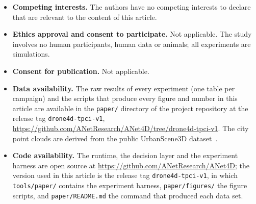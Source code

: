 \documentclass[pdflatex,sn-mathphys-num]{sn-jnl}
\begin{document}
\begin{itemize}
\item \textbf{Competing interests.} The authors have no competing interests to declare that are relevant to the
content of this article.
\item \textbf{Ethics approval and consent to participate.} Not applicable. The study involves no human participants,
human data or animals; all experiments are simulations.
\item \textbf{Consent for publication.} Not applicable.
\item \textbf{Data availability.} The raw results of every experiment (one table per campaign) and the scripts that
produce every figure and number in this article are available in the \texttt{paper/} directory of the project
repository at the release tag \texttt{drone4d-tpci-v1},
\url{https://github.com/ANetResearch/ANet4D/tree/drone4d-tpci-v1}. The city point clouds are derived from the
public UrbanScene3D dataset~\cite{lin2022urbanscene3d}.
\item \textbf{Code availability.} The runtime, the decision layer and the experiment harness are open source at
\url{https://github.com/ANetResearch/ANet4D}; the version used in this article is the release tag
\texttt{drone4d-tpci-v1}, in which \texttt{tools/paper/} contains the experiment harness, \texttt{paper/figures/} the
figure scripts, and \texttt{paper/README.md} the command that produced each data set.
\end{itemize}


\end{document}
